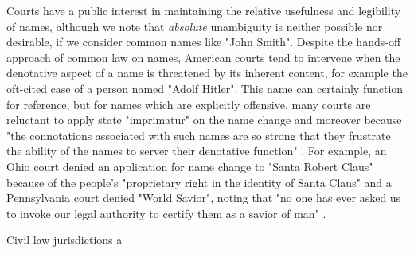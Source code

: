 Courts have a public interest in maintaining the relative usefulness and
legibility of names, although we note that \textit{absolute} unambiguity is
neither possible nor desirable, if we consider common names like "John Smith".
Despite the hands-off approach of common law on names, American courts tend to
intervene when the denotative aspect of a name is threatened by its inherent
content, for example the oft-cited case of a person named "Adolf Hitler". This
name can certainly function for reference, but for names which are explicitly
offensive, many courts are reluctant to apply state "imprimatur" on the name
change \parencite[413]{heymann11} and moreover because "the connotations
associated with such names are so strong that they frustrate the ability of the
names to server their denotative function" \parencite[417]{heymann11}. For
example, an Ohio court denied an application for name change to "Santa Robert
Claus" because of the people's "proprietary right in the identity of Santa
Claus" \parencite[419]{heymann11} \parencite{handley00} and a Pennsylvania
court denied "World Savior", noting that "no one has ever asked us to invoke
our legal authority to certify them as a savior of man"
\parencite[419]{heymann11} \parencite{bethea91}.

Civil law jurisdictions a
